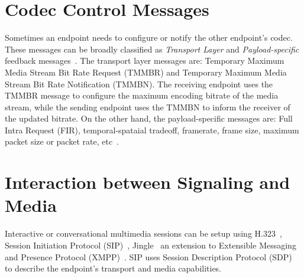

\section{Codec Control Messages}

Sometimes an endpoint needs to configure or notify the other endpoint's codec.
These messages can be broadly classified as \emph{Transport Layer} and  \emph
{Payload-specific} feedback messages~\cite{rfc5104}. The transport layer
messages are: Temporary Maximum Media Stream Bit Rate Request (TMMBR) and
Temporary Maximum Media Stream Bit Rate Notification (TMMBN). The receiving
endpoint uses the TMMBR message to configure the maximum encoding bitrate of
the media stream, while the sending endpoint uses the TMMBN to inform the
receiver of the updated bitrate. On the other hand, the payload-specific
messages are: Full Intra Request (FIR), temporal-spataial tradeoff, framerate,
frame size, maximum packet size or packet rate, etc~\cite{draft.avt.cop}.



\section{Interaction between Signaling and Media}


Interactive or conversational multimedia sessions can be setup using
H.323~\cite{H.323}, Session Initiation Protocol (SIP)~\cite{rfc3261},
Jingle~\cite{XEP-0166} an extension to Extensible Messaging and Presence
Protocol (XMPP)~\cite{rfc6120}. SIP uses Session Description Protocol
(SDP)~\cite{rfc4566} to describe the endpoint's transport and media
capabilities. 

